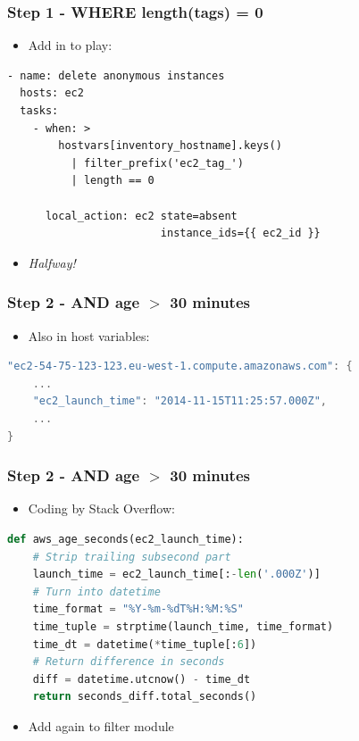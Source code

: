 \documentclass{beamer}
\begin{document}
\begin{frame}[fragile]\frametitle{Step 1 - WHERE length(tags) = 0}

    \begin{itemize}
        \item Add in to play:
    \end{itemize}

    \begin{lstlisting}
- name: delete anonymous instances
  hosts: ec2
  tasks:
    - when: >
        hostvars[inventory_hostname].keys()
          | filter_prefix('ec2_tag_')
          | length == 0

      local_action: ec2 state=absent
                        instance_ids={{ ec2_id }}
    \end{lstlisting}

    \begin{itemize}
        \item \textit{Halfway!}
    \end{itemize}

\end{frame}


\begin{frame}[fragile]\frametitle{Step 2 - AND age $>$ 30 minutes}

    \begin{itemize}
        \item Also in host variables:
    \end{itemize}

    \begin{lstlisting}[language=C]
"ec2-54-75-123-123.eu-west-1.compute.amazonaws.com": {
    ...
    "ec2_launch_time": "2014-11-15T11:25:57.000Z",
    ...
}
    \end{lstlisting}

\end{frame}


\begin{frame}[fragile]\frametitle{Step 2 - AND age $>$ 30 minutes}

    \begin{itemize}
        \item Coding by Stack Overflow:
    \end{itemize}

    \begin{lstlisting}[language=Python]
def aws_age_seconds(ec2_launch_time):
    # Strip trailing subsecond part
    launch_time = ec2_launch_time[:-len('.000Z')]
    # Turn into datetime
    time_format = "%Y-%m-%dT%H:%M:%S"
    time_tuple = strptime(launch_time, time_format)
    time_dt = datetime(*time_tuple[:6])
    # Return difference in seconds
    diff = datetime.utcnow() - time_dt
    return seconds_diff.total_seconds()
    \end{lstlisting}

    \begin{itemize}
        \item Add again to filter module
    \end{itemize}

\end{frame}
\end{document}
